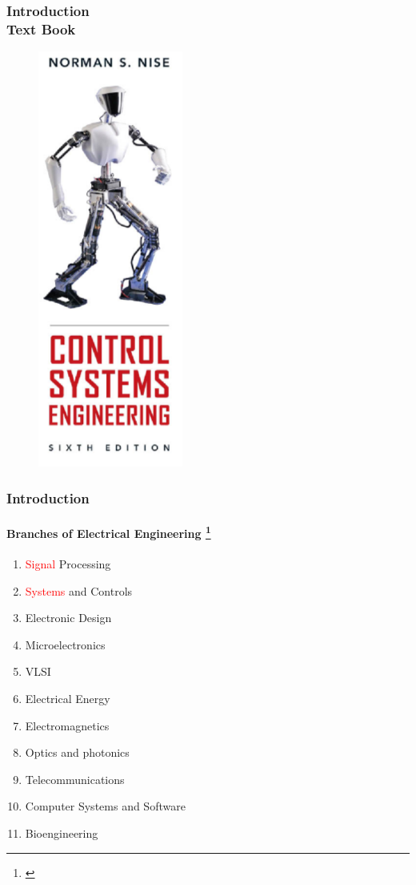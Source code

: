 \documentclass[hyperref={pdfpagelabels=true}]{beamer}
\begin{document}
\begin{frame}
\frametitle{Introduction \\ {\large Text Book}}
\begin{figure}[!tbp]
\centering
\includegraphics[scale = 0.35]{figs/Selection_010.png}
\end{figure}
\end{frame}
\begin{frame}
\frametitle{Introduction}
\framesubtitle{Branches of Electrical Engineering \footnote{\href{http://www.ece.gatech.edu/research/tigs/overview.php}{}}}
\begin{enumerate}
\item \textcolor{red}{Signal} Processing
\item \textcolor{red}{Systems} and Controls
\item Electronic Design
\item Microelectronics
\item VLSI
\item Electrical Energy
\item Electromagnetics
\item Optics and photonics
\item Telecommunications
\item Computer Systems and Software
\item Bioengineering
\end{enumerate}
\end{frame}
\end{document}
